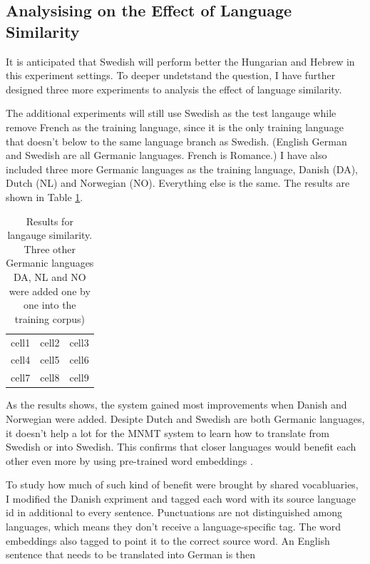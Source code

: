 \documentclass[thesis,fonts=libertine]{cluu}
\begin{document}
\subsection{Analysising on the Effect of Language Similarity}

It is anticipated that Swedish will perform better the Hungarian and Hebrew in this experiment settings. To deeper undetstand the question, I have further designed three more experiments to analysis the effect of language similarity.

The additional experiments will still use Swedish as the test langauge while remove French as the training language, since it is the only training language that doesn't below to the same language branch as Swedish. (English German and Swedish are all Germanic languages. French is Romance.) I have also included three more Germanic languages as the training language, Danish (DA), Dutch (NL) and Norwegian (NO). Everything else is the same. The results are shown in Table \ref{table:language_similarity}.

\begin{table}
  \centering
  \begin{tabular}{c c c}
    cell1 & cell2 & cell3 \\ 
    cell4 & cell5 & cell6 \\  
    cell7 & cell8 & cell9 
  \end{tabular}
  \caption{Results for langauge similarity. Three other Germanic languages DA, NL and NO were added one by one into the training corpus)}
  \label{table:language_similarity}
\end{table}

As the results shows, the system gained most improvements when Danish and Norwegian were added. Desipte Dutch and Swedish are both Germanic languages, it doesn't help a lot for the MNMT system to learn how to translate from Swedish or into Swedish. This confirms that closer languages would benefit each other even more by using pre-trained word embeddings \parencite{Qi:2018aa}.

To study how much of such kind of benefit were brought by shared vocabluaries, I modified the Danish expriment and tagged each word with its source language id in additional to every sentence. Punctuations are not distinguished among languages, which means they don't receive a language-specific tag. The word embeddings also tagged to point it to the correct source word. An English sentence that needs to be translated into German is then 
\end{document}
